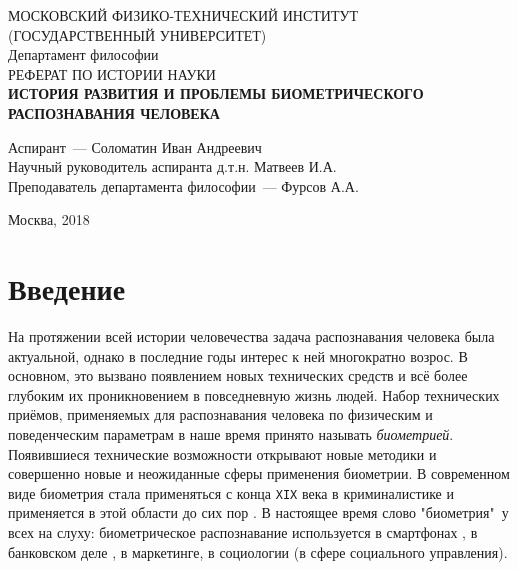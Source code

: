 \documentclass[14pt, a4paper]{extarticle}
\begin{document}
	\begin{titlepage}
		\begin{center}
			\hfill \break
			МОСКОВСКИЙ ФИЗИКО-ТЕХНИЧЕСКИЙ ИНСТИТУТ\\ (ГОСУДАРСТВЕННЫЙ УНИВЕРСИТЕТ)\\
			\hfill \break
			\hfill \break
			\hfill \break
			\hfill \break
			\hfill \break
			Департамент философии\\
			\hfill \break
			\hfill \break
			РЕФЕРАТ ПО ИСТОРИИ НАУКИ\\
			\hfill \break
			\hfill \break
			\large{\textbf{ИСТОРИЯ РАЗВИТИЯ И ПРОБЛЕМЫ БИОМЕТРИЧЕСКОГО РАСПОЗНАВАНИЯ ЧЕЛОВЕКА}}\\
			\hfill \break		
		\end{center}
		
		\begin{center}
			\hfill \break
			\parbox{0.9\textwidth}
			{
				Аспирант~--- Соломатин Иван Андреевич \\
				Научный руководитель аспиранта \underline{\hspace{3cm}} д.т.н. Матвеев И.А. \\
				Преподаватель департамента философии~--- Фурсов А.А. \\
			}
		\end{center}
		\hfill \break
		\hfill \break
		\hfill \break
		\hfill \break
		\begin{center} Москва, 2018 
		\end{center}
		\thispagestyle{empty} 
	\end{titlepage}
	
\tableofcontents
\newpage

\section{Введение}
На протяжении всей истории человечества задача распознавания человека была актуальной, однако в последние годы интерес к ней многократно возрос. В основном, это вызвано появлением новых технических средств и всё более глубоким их проникновением в повседневную жизнь людей. Набор технических приёмов, применяемых для распознавания человека по физическим и поведенческим параметрам в наше время принято называть \textit{биометрией}. Появившиеся технические возможности открывают новые методики и совершенно новые и неожиданные сферы применения биометрии. В современном виде биометрия стала применяться с конца \texttt{XIX} века в криминалистике и применяется в этой области до сих пор \cite{tistarelli2014biometrics, bouchrika2011using}. В настоящее время слово "биометрия"\ у всех на слуху: биометрическое распознавание используется в смартфонах \cite{odinokikh2018high, sezan2014user, hwang2009keystroke}, в банковском деле \cite{fatima2011banking, venkatraman2008biometrics}, в маркетинге, в социологии (в сфере социального управления).
\end{document}
